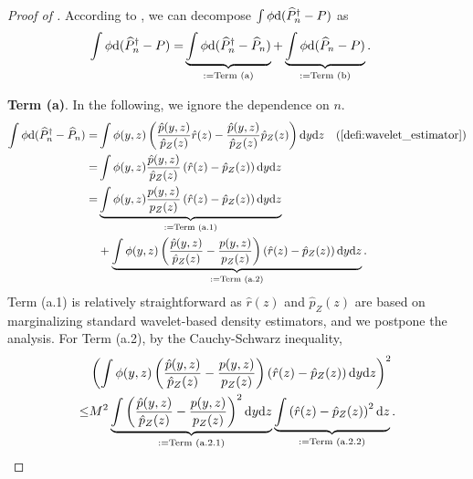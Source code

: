 \documentclass{article}
\theoremstyle{plain}
\theoremstyle{definition}
\def\PP{P}
\theoremstyle{plain}
\newcommand{\diff}{{\rm d}}
\newcommand{\zg}[1]{{\color{blue} [ZG: #1]}}
\begin{document}
\begin{proof}[Proof of ]
According to , we can decompose $\int \phi \diff (\widehat P_n^{\dagger} - \PP)$ as
\begin{align*}
    \int \phi \diff (\widehat P_n^{\dagger} - \PP) 
    =& \underbrace{\int \phi \diff (\widehat P_n^{\dagger} -  \widehat \PP_n)}_{:=\text{Term (a)}} + \underbrace{\int \phi \diff (\widehat \PP_n - \PP)}_{:=\text{Term (b)}}.
\end{align*}


\textbf{Term (a)}. In the following, we ignore the dependence on $n$.
\begin{align*}
\int \phi \diff (\widehat P_n^{\dagger} -  \widehat \PP_n)
=& \int \phi(y,z) \left(\frac{\hat p(y,z)}{\hat p_Z(z)} \hat r(z) - \frac{\hat p(y,z)}{\hat p_Z(z)} \hat p_Z(z)  \right) \diff y \diff z  \quad (\text{\Cref{defi:wavelet_estimator}})\\
=& \int \phi(y,z) \frac{\hat p(y,z)}{\hat p_Z(z)} \left(\hat r(z) -\hat p_Z(z)\right) \diff y\diff z \\
=& \underbrace{\int \phi(y,z) \frac{p(y,z)}{p_Z(z)} \left(\hat r(z) -\hat p_Z(z)\right) \diff y\diff z}_{:=\text{Term (a.1)}} \\
&+ \underbrace{\int \phi(y,z) \left(\frac{\hat p(y,z)}{\hat p_Z(z)} - \frac{p(y,z)}{p_Z(z)} \right) \left(\hat r(z) -\hat p_Z(z)\right) \diff y\diff z}_{:=\text{Term (a.2)}}.
\end{align*}
Term (a.1) is relatively straightforward as  $\hat r(z)$ and $\hat p_Z(z)$ are based on marginalizing standard wavelet-based density estimators, and we postpone the analysis.
For Term (a.2), by the Cauchy-Schwarz inequality,
\begin{align*}
    &\left(\int \phi(y,z) \left(\frac{\hat p(y,z)}{\hat p_Z(z)} - \frac{p(y,z)}{p_Z(z)} \right) \left(\hat r(z) -\hat p_Z(z)\right) \diff y\diff z \right)^2\\
    \le &M^2 \underbrace{\int \left(\frac{\hat p(y,z)}{\hat p_Z(z)} - \frac{p(y,z)}{p_Z(z)} \right)^2 \diff y\diff z}_{:=\text{Term (a.2.1)}}  \underbrace{\int \left(\hat r(z) -\hat p_Z(z)\right)^2 \diff z}_{:=\text{Term (a.2.2)}}.
\end{align*}



\end{proof}
\end{document}
